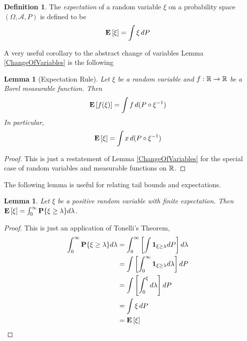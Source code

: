 \documentclass{amsart}
\newtheorem{lem}[thm]{Lemma}
\theoremstyle{remark}
\theoremstyle{definition}
\newtheorem{defn}[thm]{Definition}
\begin{document}
\begin{defn}The \emph{expectation} of a random variable $\xi$ on a
  probability space $(\Omega, \mathcal{A}, P)$ is
  defined to be 
\begin{align*}
\textbf{E}\left[\xi\right] = \int \xi \, dP
\end{align*}
\end{defn}
A very useful corollary to the abstract change of variables Lemma
\ref{ChangeOfVariables} is the following
\begin{lem}[Expectation Rule]\label{ExpectationRule}Let $\xi$ be a random variable and $f: \mathbb{R} \to \mathbb{R}$
  be a Borel measurable function.  Then 
\begin{align*}
\textbf{E}\left[f(\xi)\right] = \int f \, d (P \circ \xi^{-1})
\end{align*}
In particular, 
\begin{align*}
\textbf{E}\left[\xi\right] = \int x \, d (P \circ \xi^{-1})
\end{align*}
\end{lem}
\begin{proof}This is just a restatement of Lemma
  \ref{ChangeOfVariables} for the special case of random variables and
  measurable functions on $\mathbb{R}$.
\end{proof}

The following lemma is useful for relating tail bounds and expectations.
\begin{lem}\label{TailsAndExpectations}Let $\xi$ be a positive random variable with finite
  expectation.  Then $\textbf{E}\left[\xi\right] = \int_0^\infty \textbf{P}\{\xi \geq
    \lambda\} d\lambda$.
\end{lem}
\begin{proof}
This is just an application of Tonelli's Theorem,
\begin{align*}
\int_0^\infty \textbf{P}\{\xi \geq \lambda\}d\lambda &= \int_0^\infty \left[\int
\textbf{1}_{\xi \geq \lambda} dP\right] d\lambda \\
&= \int\left[\int_0^\infty \textbf{1}_{\xi \geq \lambda} d\lambda\right] dP \\
&= \int\left[\int_0^{\xi} d\lambda\right] dP \\
&= \int \xi \, dP \\
&= \textbf{E}\left[\xi\right] \\
\end{align*}
\end{proof}
\end{document}
